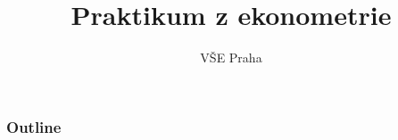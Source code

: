 \documentclass{beamer}
\title[Týden 5]{Praktikum z ekonometrie} %
\author{VŠE Praha} %
\institute[4EK417] %
{
\medskip
\textit{Tomáš Formánek} %
}
\date{} %
\begin{document}
\begin{frame}
\titlepage %
\end{frame}

\begin{frame}
\frametitle{Outline} %
\tableofcontents %
\end{frame}
\end{document}
